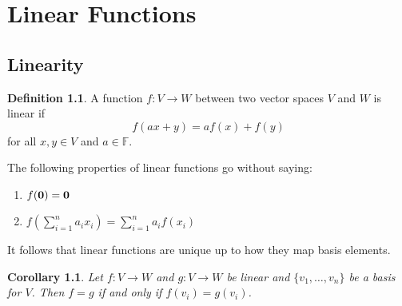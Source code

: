 \documentclass[oneside, 12pt]{book}
\newtheorem{cor}{Corollary}[section]
\theoremstyle{definition}
\newtheorem{defn}{Definition}[section]
\begin{document}
\chapter{Linear Functions}
\section{Linearity}
\begin{defn}
\label{defn_lin}
  A function $f: V \to W$ between two vector spaces $V$ and $W$ is linear if
  \[f(ax+y)=af(x)+f(y)\] for all $x, y \in V$ and $a \in \mathbb{F}$.
\end{defn}
The following properties of linear functions go without saying:
\begin{enumerate}
  \item $f(\bold{0})=\bold{0}$
  \item $f(\sum_{i=1}^{n}a_{i}x_{i})=\sum_{i=1}^{n}a_{i}f(x_{i})$
\end{enumerate}
It follows that linear functions are unique up to how they map basis elements.
\begin{cor}
\label{cor_linbas}
  Let $f:V \to W$ and $g: V \to W$ be linear and $\{v_{1}, \dots, v_{n}\}$ be a basis for $V$. Then $f=g$ if and only if $f(v_{i})=g(v_{i})$.
\end{cor}
\end{document}
